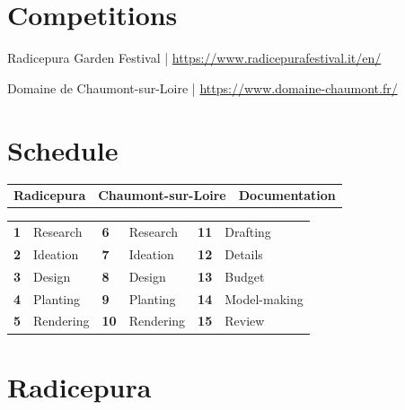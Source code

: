 \documentclass[11pt,article,oneside]{memoir}
\begin{document}

\section{Competitions}

\noindent
Radicepura Garden Festival | \url{https://www.radicepurafestival.it/en/}

\noindent
Domaine de Chaumont-sur-Loire | \url{https://www.domaine-chaumont.fr/}


\section{Schedule}

\begin{table}[H]
\begin{tabular}{@{} l @{\hskip 8.25em} l @{\hskip 4.75em} l}
\textbf{Radicepura} & \textbf{Chaumont-sur-Loire} & \textbf{Documentation}\\
\end{tabular}
\end{table}

\vspace*{-1em}

\begin{table}[H]
\small
\begin{tabular}{@{} l l l l l l}
\small
\textbf{1} & Research \hspace{7em} & \textbf{6} & Research \hspace{7em} & \textbf{11} & Drafting \\
\textbf{2} & Ideation & \textbf{7} & Ideation & \textbf{12} & Details \\
\textbf{3} & Design & \textbf{8} & Design & \textbf{13} & Budget \\
\textbf{4} & Planting & \textbf{9} & Planting & \textbf{14} & Model-making \\
\textbf{5} & Rendering & \textbf{10} & Rendering & \textbf{15} & Review \\
\end{tabular}
\end{table}

\clearpage


\section{Radicepura}
\end{document}
